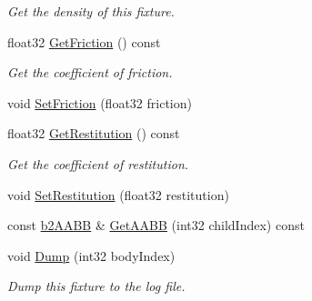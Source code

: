 \begin{DoxyCompactItemize}
\begin{DoxyCompactList}\small\item\em Get the density of this fixture. \end{DoxyCompactList}\item 
\hypertarget{classb2_fixture_a31253b90b87f1fec7256bba92aeb4645}{float32 \hyperlink{classb2_fixture_a31253b90b87f1fec7256bba92aeb4645}{Get\-Friction} () const }\label{classb2_fixture_a31253b90b87f1fec7256bba92aeb4645}

\begin{DoxyCompactList}\small\item\em Get the coefficient of friction. \end{DoxyCompactList}\item 
void \hyperlink{classb2_fixture_ad0cd91eef5858c8ef1d6b62cc2a34ea2}{Set\-Friction} (float32 friction)
\item 
\hypertarget{classb2_fixture_a6ce4d949ffff6201a117f1e3833953f8}{float32 \hyperlink{classb2_fixture_a6ce4d949ffff6201a117f1e3833953f8}{Get\-Restitution} () const }\label{classb2_fixture_a6ce4d949ffff6201a117f1e3833953f8}

\begin{DoxyCompactList}\small\item\em Get the coefficient of restitution. \end{DoxyCompactList}\item 
void \hyperlink{classb2_fixture_a19c507332e4f7bd04a05f00426f11ee4}{Set\-Restitution} (float32 restitution)
\item 
const \hyperlink{structb2_a_a_b_b}{b2\-A\-A\-B\-B} \& \hyperlink{classb2_fixture_abdc2a225110310a481a78cdb14000ca7}{Get\-A\-A\-B\-B} (int32 child\-Index) const 
\item 
\hypertarget{classb2_fixture_a57485e73a2063060e320c7176676cd5e}{void \hyperlink{classb2_fixture_a57485e73a2063060e320c7176676cd5e}{Dump} (int32 body\-Index)}\label{classb2_fixture_a57485e73a2063060e320c7176676cd5e}

\begin{DoxyCompactList}\small\item\em Dump this fixture to the log file. \end{DoxyCompactList}\end{DoxyCompactItemize}
